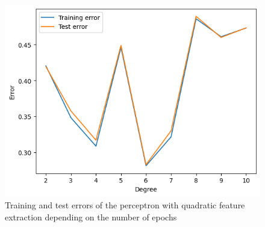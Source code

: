 \documentclass{article}
\begin{document}
\begin{figure}
	\centering
	\includegraphics[width=0.8\columnwidth]{../plots/kpoly_perceptron.png}
	\caption{Training and test errors of the perceptron with quadratic feature extraction depending on the number of epochs}
	\label{fig:kpoly_perceptron}
\end{figure}
\end{document}
